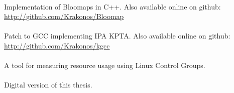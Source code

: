 
 \\ 
\indent Implementation of Bloomaps in C++. Also available online on github: \goodbreak \url{http://github.com/Krakonos/Bloomap} \\

 \\
\indent Patch to GCC implementing IPA KPTA. Also available online on github: \goodbreak \url{http://github.com/Krakonos/kgcc} \\

				 \\
\indent A tool for measuring resource usage using Linux Control Groups. \\

 \\
\indent Digital version of this thesis.
